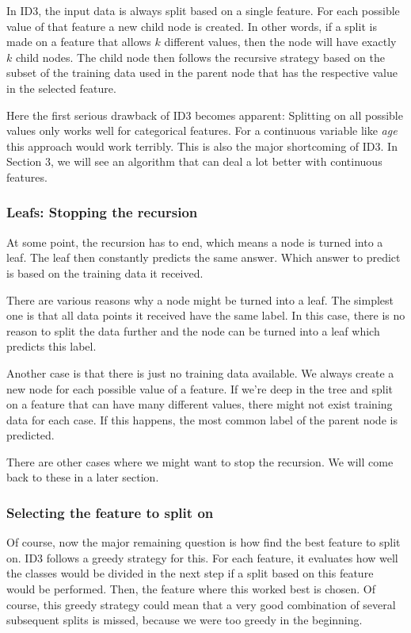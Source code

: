 \documentclass[a4paper]{article}
\begin{document}
In ID3, the input data is always split based on a single feature. For each possible value of that feature a new child node is created.
In other words, if a split is made on a feature that allows $k$ different values, then the node will have exactly $k$ child nodes.
The child node then follows the recursive strategy based on the subset of the training data used in the parent node that has the respective value in the selected feature.

Here the first serious drawback of ID3 becomes apparent: Splitting on all possible values only works well for categorical features. For a continuous variable like \emph{age} this approach would work terribly. This is also the major shortcoming of ID3. In Section 3, we will see an algorithm that can deal a lot better with continuous features.

\subsubsection{Leafs: Stopping the recursion}

At some point, the recursion has to end, which means a node is turned into a leaf. The leaf then constantly predicts the same answer. Which answer to predict is based on the training data it received.

There are various reasons why a node might be turned into a leaf. The simplest one is that all data points it received have the same label. In this case, there is no reason to split the data further and the node can be turned into a leaf which predicts this label.

Another case is that there is just no training data available. We always create a new node for each possible value of a feature. If we're deep in the tree and split on a feature that can have many different values, there might not exist training data for each case. If this happens, the most common label of the parent node is predicted.

There are other cases where we might want to stop the recursion. We will come back to these in a later section.

\subsubsection{Selecting the feature to split on}

Of course, now the major remaining question is how find the best feature to split on. ID3 follows a greedy strategy for this. For each feature, it evaluates how well the classes would be divided in the next step if a split based on this feature would be performed. Then, the feature where this worked best is chosen. Of course, this greedy strategy could mean that a very good combination of several subsequent splits is missed, because we were too greedy in the beginning.
\end{document}
